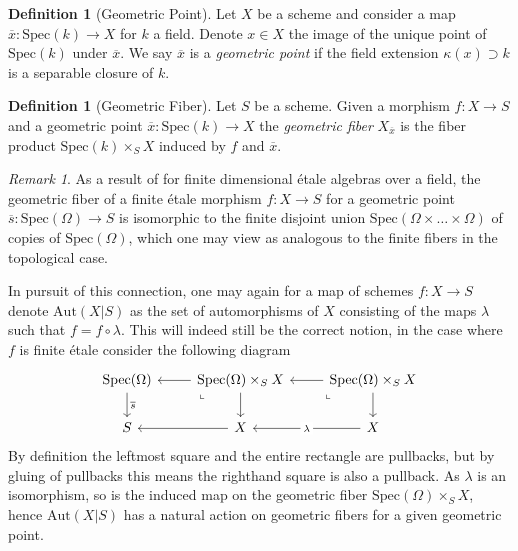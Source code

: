 \documentclass{article}
\theoremstyle{definition}
\newtheorem{definition}[theorem]{Definition}
\theoremstyle{remark}
\newtheorem*{remark}{Remark}
\theoremstyle{plain}
\begin{document}
\begin{definition}[Geometric Point]
	Let $X$ be a scheme and consider a map $\overline{x}: \text{Spec}(k) \to X$ for $k$ a field.
	Denote $x \in X$ the image of the unique point of $\text{Spec}(k)$ under $\overline{x}$.
	We say $\overline{x}$ is a \textit{geometric point} if the field extension $\kappa(x) \supset k$ is a separable closure of $k$.
\end{definition}

\begin{definition}[Geometric Fiber]
	Let $S$ be a scheme. 
	Given a morphism $f: X \to S$ and a geometric point $\overline{x}: \text{Spec}(k) \to X$ the \textit{geometric fiber} $X_{\overline{x}}$ is the fiber product $\text{Spec}(k) \times_S X$ induced by $f$ and $\overline{x}$.
\end{definition}

\begin{remark}
As a result of  for finite dimensional \'etale algebras over a field, the geometric fiber of a finite \'etale morphism $f: X \to S$ for a geometric point $\overline{s} : \text{Spec}(\Omega) \to S $ is isomorphic to the finite disjoint union $\text{Spec}(\Omega \times \dots \times \Omega)$ of copies of $\text{Spec}(\Omega)$, which one may view as analogous to the finite fibers in the topological case.
\end{remark}

In pursuit of this connection, one may again for a map of schemes $f: X \to S$ denote $\text{Aut}(X|S)$ as the set of automorphisms of $X$ consisting of the maps $\lambda$ such that $f  = f \circ \lambda$.
This will indeed still be the correct notion, in the case where $f$ is finite \'etale consider the following diagram
\[\begin{tikzcd}
	{\text{Spec}(\Omega)} & {\text{Spec}(\Omega)\times_S X} & {\text{Spec}(\Omega)\times_S X} \\
	S & X & X
	\arrow["{\overline{s}}", from=1-1, to=2-1]
	\arrow[from=1-2, to=1-1]
	\arrow["\lrcorner"{anchor=center, pos=0.125, rotate=-90}, draw=none, from=1-2, to=2-1]
	\arrow[from=1-2, to=2-2]
	\arrow[from=1-3, to=1-2]
	\arrow["\lrcorner"{anchor=center, pos=0.125, rotate=-90}, draw=none, from=1-3, to=2-2]
	\arrow[from=1-3, to=2-3]
	\arrow[from=2-2, to=2-1]
	\arrow["\lambda"{description}, from=2-3, to=2-2]
\end{tikzcd}\]
By definition the leftmost square and the entire rectangle are pullbacks, but by gluing of pullbacks this means the righthand square is also a pullback.
As $\lambda$ is an isomorphism, so is the induced map on the geometric fiber $\text{Spec}(\Omega)\times_S X$, hence $\text{Aut}(X|S)$ has a natural action on geometric fibers for a given geometric point.
\end{document}
